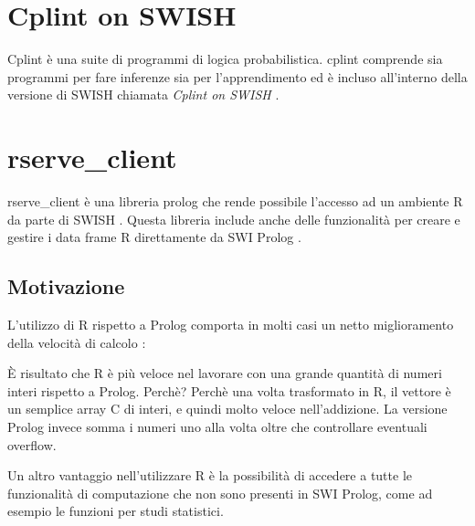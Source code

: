 \documentclass[10pt,titlepage,twoside,a4paper]{report}
\begin{document}

\section{Cplint on SWISH}
Cplint è una suite di programmi di logica probabilistica. cplint comprende sia 
programmi per fare inferenze sia per l'apprendimento \cite{cplint} ed è 
incluso all'interno della versione di SWISH chiamata \emph{Cplint on SWISH} 
\cite{cplintOnSwish}.


    \section{rserve\_client}
rserve\_client è una libreria prolog che rende possibile 
l'accesso ad un ambiente R da parte di SWISH \cite{rserveClientDefinition} 
\cite{rserveclient}. Questa libreria include anche delle funzionalità per 
creare e gestire i data frame R direttamente da SWI Prolog 
\cite{swishRDataLibrary}.
    
        \subsection{Motivazione}
L'utilizzo di R rispetto a Prolog comporta in molti casi un netto miglioramento 
della velocità di calcolo \cite{rFaster}:
\begin{displayquote}
[..] È risultato che R è più veloce nel lavorare con una grande quantità
di numeri interi rispetto a Prolog. Perchè? Perchè una volta trasformato in R,
il vettore è un semplice array C di interi, e quindi molto veloce 
nell'addizione. La versione Prolog invece somma i numeri uno alla volta
oltre che controllare eventuali overflow.
\end{displayquote}

Un altro vantaggio nell'utilizzare R è la possibilità di accedere a tutte le 
funzionalità di computazione che non sono presenti in SWI Prolog, come ad 
esempio le funzioni per studi statistici.
 
\end{document}
